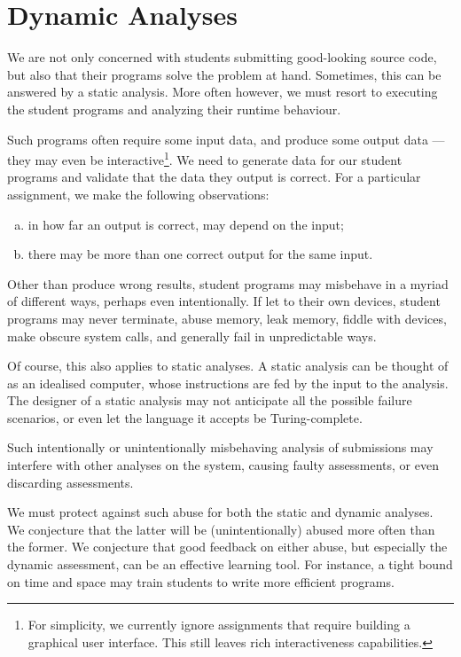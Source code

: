 \section{Dynamic Analyses}

We are not only concerned with students submitting good-looking source code,
but also that their programs solve the problem at hand. Sometimes, this can be
answered by a static analysis. More often however, we must resort to executing
the student programs and analyzing their runtime behaviour.

Such programs often require some input data, and produce some output data ---
they may even be interactive\footnote{For simplicity, we currently ignore
assignments that require building a graphical user interface. This still leaves
rich interactiveness capabilities.}. We need to generate data for our student
programs and validate that the data they output is correct. For a particular
assignment, we make the following observations:

\begin{enumerate}[(a)]

\item in how far an output is correct, may depend on the input;

\item there may be more than one correct output for the same input.

\end{enumerate}

Other than produce wrong results, student programs may misbehave in a myriad of
different ways, perhaps even intentionally. If let to their own devices,
student programs may never terminate, abuse memory, leak memory, fiddle with
devices, make obscure system calls, and generally fail in unpredictable ways.

Of course, this also applies to static analyses. A static analysis can be
thought of as an idealised computer, whose instructions are fed by the input to
the analysis. The designer of a static analysis may not anticipate all the
possible failure scenarios, or even let the language it accepts be
Turing-complete.

Such intentionally or unintentionally misbehaving analysis of submissions may
interfere with other analyses on the system, causing faulty assessments, or
even discarding assessments.

We must protect against such abuse for both the static and dynamic analyses. We
conjecture that the latter will be (unintentionally) abused more often than the
former. We conjecture that good feedback on either abuse, but especially the
dynamic assessment, can be an effective learning tool. For instance, a tight
bound on time and space may train students to write more efficient programs.

